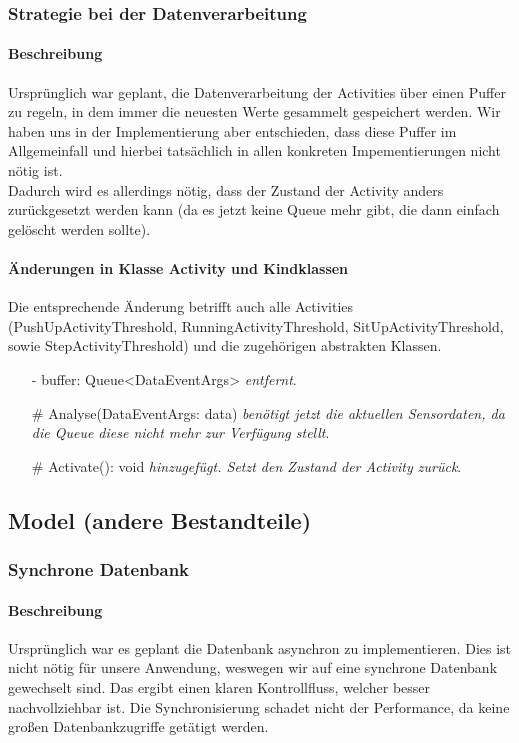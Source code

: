 \documentclass[a4paper,12pt]{article}
\begin{document}
\subsubsection{Strategie bei der Datenverarbeitung}
\paragraph{Beschreibung}
Ursprünglich war geplant, die Datenverarbeitung der Activities über einen Puffer zu regeln, in dem immer die neuesten Werte gesammelt gespeichert werden. Wir haben uns in der Implementierung aber entschieden, dass diese Puffer im Allgemeinfall und hierbei tatsächlich in allen konkreten Impementierungen nicht nötig ist.\\
Dadurch wird es allerdings nötig, dass der Zustand der Activity anders zurückgesetzt werden kann (da es jetzt keine Queue mehr gibt, die dann einfach gelöscht werden sollte).
\paragraph{Änderungen in Klasse Activity und Kindklassen}
Die entsprechende Änderung betrifft auch alle Activities (PushUpActivityThreshold, RunningActivityThreshold, SitUpActivityThreshold, sowie StepActivityThreshold) und die zugehörigen abstrakten Klassen.
\begin{itemize}
	\item [-] buffer: Queue<DataEventArgs> \textit{entfernt}.
	\item [\#] Analyse(DataEventArgs: data) \textit{benötigt jetzt die aktuellen Sensordaten, da die Queue diese nicht mehr zur Verfügung stellt}.
	\item [\#] Activate(): void \textit{hinzugefügt. Setzt den Zustand der Activity zurück}.
\end{itemize}
\subsection{Model (andere Bestandteile)}

\subsubsection{Synchrone Datenbank}
\paragraph{Beschreibung}
Ursprünglich war es geplant die Datenbank asynchron zu implementieren. Dies ist nicht nötig für unsere Anwendung, weswegen wir auf eine synchrone Datenbank gewechselt sind. Das ergibt einen klaren Kontrollfluss, welcher besser nachvollziehbar ist. Die Synchronisierung schadet nicht der Performance, da keine großen Datenbankzugriffe getätigt werden.
\end{document}
